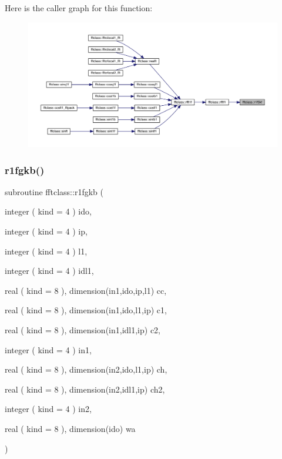 Here is the caller graph for this function\+:\nopagebreak
\begin{figure}[H]
\begin{center}
\leavevmode
\includegraphics[width=350pt]{namespacefftclass_acc419931cfa3ec3e19e6264b35e83aae_icgraph}
\end{center}
\end{figure}
\mbox{\label{namespacefftclass_aa5cb9e2d3b6aa9d5adcb4144cd17f10e}} 
\subsubsection{\texorpdfstring{r1fgkb()}{r1fgkb()}}
{\footnotesize\ttfamily subroutine fftclass\+::r1fgkb (\begin{DoxyParamCaption}\item[{integer ( kind = 4 )}]{ido,  }\item[{integer ( kind = 4 )}]{ip,  }\item[{integer ( kind = 4 )}]{l1,  }\item[{integer ( kind = 4 )}]{idl1,  }\item[{real ( kind = 8 ), dimension(in1,ido,ip,l1)}]{cc,  }\item[{real ( kind = 8 ), dimension(in1,ido,l1,ip)}]{c1,  }\item[{real ( kind = 8 ), dimension(in1,idl1,ip)}]{c2,  }\item[{integer ( kind = 4 )}]{in1,  }\item[{real ( kind = 8 ), dimension(in2,ido,l1,ip)}]{ch,  }\item[{real ( kind = 8 ), dimension(in2,idl1,ip)}]{ch2,  }\item[{integer ( kind = 4 )}]{in2,  }\item[{real ( kind = 8 ), dimension(ido)}]{wa }\end{DoxyParamCaption})}

